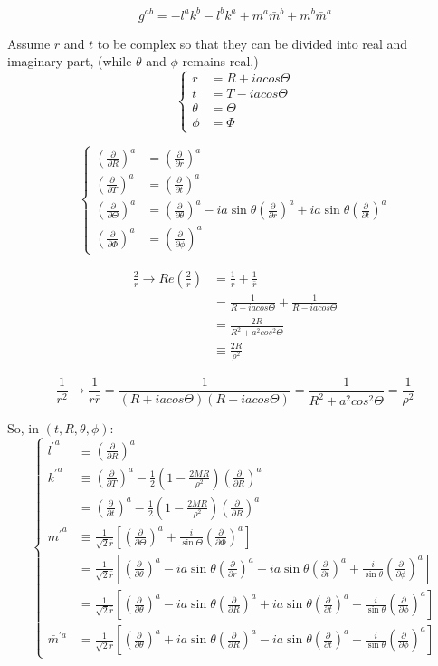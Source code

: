 \documentclass{article}
\newcommand{\be}{\begin{equation}}
\newcommand{\ee}{\end{equation}}
\newcommand{\p}{\partial}
\newcommand{\1}{\left}
\newcommand{\2}{\right}
\begin{document}
\be
g^{ab}=-l^ak^b-l^bk^a+m^a{\bar m}^b+m^b{\bar m}^a
\ee

Assume $r$ and $t$ to be complex so that they can be divided into real and imaginary part, (while $\theta$ and $\phi$ remains real,)
\be
\1\{
\begin{split}
r&=R+iacos\Theta\\
t&=T-iacos\Theta\\
\theta&=\Theta\\
\phi&=\Phi
\end{split}
\2.
\ee

\be
\1\{
\begin{split}
\1(\frac \p {\p R}\2)^a&=\1(\frac \p {\p r}\2)^a\\
\1(\frac \p {\p T}\2)^a&=\1(\frac \p {\p t}\2)^a\\
\1(\frac \p {\p \Theta}\2)^a&=\1(\frac \p {\p \theta}\2)^a-ia\sin\theta\1(\frac \p {\p r}\2)^a+ia\sin\theta\1(\frac \p {\p t}\2)^a\\
\1(\frac \p {\p \Phi}\2)^a&=\1(\frac \p {\p \phi}\2)^a
\end{split}
\2.
\ee

\be
\begin{split}
\frac 2 r \rightarrow Re\1(\frac 2 r\2)&=\frac 1 r+\frac 1 {\bar r}\\
&=\frac 1 {R+iacos\Theta}+\frac 1 {R-iacos\Theta}\\
&=\frac{2R}{{R}^2+a^2 cos^2 \Theta}\\
&\equiv \frac{2R}{\rho^2}
\end{split}
\ee

\be
\frac 1 {r^2} \rightarrow \frac 1 {r \bar r}=\frac{1}{(R+iacos\Theta)(R-iacos\Theta)}=\frac{1}{{R}^2+a^2 cos^2 \Theta}=\frac{1}{\rho^2}
\ee

So, in $(t,R,\theta,\phi)$:
\be
\1\{
\begin{split}
{l^\prime}^a&\equiv \1(\frac \p {\p R}\2)^a\\
{k^\prime}^a&\equiv \1(\frac \p {\p T}\2)^a-\frac 1 2 \1(1-\frac{2MR}{\rho^2}\2)\1(\frac \p {\p R}\2)^a\\
&=\1(\frac \p {\p t}\2)^a-\frac 1 2 \1(1-\frac{2MR}{\rho^2}\2)\1(\frac \p {\p R}\2)^a\\
{m^\prime}^a&\equiv \frac 1 {\sqrt 2 \bar r}\1[\1(\frac \p {\p\Theta}\2)^a+\frac i {\sin\Theta} \1(\frac \p {\p\Phi}\2)^a\2]\\
&=\frac 1 {\sqrt 2 \bar r}\1[\1(\frac \p {\p \theta}\2)^a-ia\sin\theta\1(\frac \p {\p r}\2)^a+ia\sin\theta\1(\frac \p {\p t}\2)^a+\frac i {\sin\theta} \1(\frac \p {\p\phi}\2)^a\2]\\
&=\frac 1 {\sqrt 2 \bar r}\1[\1(\frac \p {\p \theta}\2)^a-ia\sin\theta\1(\frac \p {\p R}\2)^a+ia\sin\theta\1(\frac \p {\p t}\2)^a+\frac i {\sin\theta} \1(\frac \p {\p\phi}\2)^a\2]\\
{\bar m}^{\prime a}
&=\frac 1 {\sqrt 2 r}\1[\1(\frac \p {\p \theta}\2)^a+ia\sin\theta\1(\frac \p {\p R}\2)^a-ia\sin\theta\1(\frac \p {\p t}\2)^a-\frac i {\sin\theta} \1(\frac \p {\p\phi}\2)^a\2]
\end{split}
\2.
\ee
\end{document}
